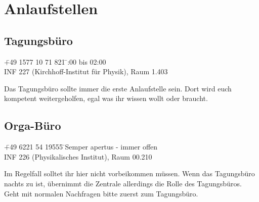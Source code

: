 
\section{Anlaufstellen}

\subsection{Tagungsbüro}
\begin{tabbing}
\faPhone \quad \quad \= +49 1577 10 71 821 \quad \quad \faClockO \= \quad {}:00 bis 02:00 \\ %
\faMapPin \> INF 227 (Kirchhoff-Institut für Physik), Raum 1.403 %
\end{tabbing}

\noindent Das Tagungsbüro sollte immer die erste Anlaufstelle sein. Dort wird euch kompetent weitergeholfen, egal was ihr wissen wollt oder braucht.

\subsection{Orga-Büro}
\begin{tabbing}
\faPhone \quad \quad \= +49 6221 54 19555 \quad \quad \faClockO \= \quad \quad  Semper apertus - immer offen\\
\faMapPin \> INF 226 (Physikalisches Institut), Raum 00.210
\end{tabbing}

\noindent Im Regelfall solltet ihr hier nicht vorbeikommen müssen. Wenn das Tagungsbüro nachts zu ist, übernimmt die Zentrale allerdings die Rolle des Tagungsbüros. Geht mit normalen Nachfragen bitte zuerst zum Tagungsbüro. %



